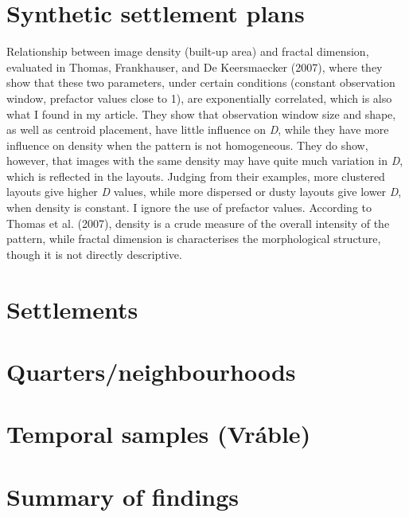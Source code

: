 \documentclass[
  12pt,
]{book}
\begin{document}
\hypertarget{synthetic-settlement-plans}{%
\section{Synthetic settlement plans}\label{synthetic-settlement-plans}}

Relationship between image density (built-up area) and fractal dimension, evaluated in Thomas, Frankhauser, and De Keersmaecker (2007), where they show that these two parameters, under certain conditions (constant observation window, prefactor values close to 1), are exponentially correlated, which is also what I found in my article. They show that observation window size and shape, as well as centroid placement, have little influence on \emph{D}, while they have more influence on density when the pattern is not homogeneous. They do show, however, that images with the same density may have quite much variation in \emph{D}, which is reflected in the layouts. Judging from their examples, more clustered layouts give higher \emph{D} values, while more dispersed or dusty layouts give lower \emph{D}, when density is constant. I ignore the use of prefactor values. According to Thomas et al. (2007), density is a crude measure of the overall intensity of the pattern, while fractal dimension is characterises the morphological structure, though it is not directly descriptive.

\hypertarget{settlements-1}{%
\section{Settlements}\label{settlements-1}}

\hypertarget{quartersneighbourhoods-1}{%
\section{Quarters/neighbourhoods}\label{quartersneighbourhoods-1}}

\hypertarget{temporal-samples-vruxe1ble-1}{%
\section{Temporal samples (Vráble)}\label{temporal-samples-vruxe1ble-1}}

\hypertarget{summary-of-findings-1}{%
\section{Summary of findings}\label{summary-of-findings-1}}
\end{document}
